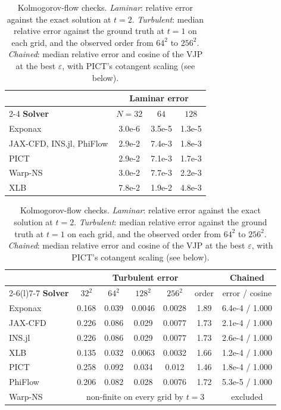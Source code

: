 \begin{table}[h]
  \centering\small
  \caption{Kolmogorov-flow checks. \emph{Laminar}: relative error against the
    exact solution at $t = 2$. \emph{Turbulent}: median relative error against
    the ground truth at $t = 1$ on each grid, and the observed order from $64^2$
    to $256^2$. \emph{Chained}: median relative error and cosine of the VJP at
    the best $\varepsilon$, with PICT's cotangent scaling (see below).}
  \label{tab:app:kolmogorov}
  \begin{tabular}{@{}lccc@{}}
    \toprule
    & \multicolumn{3}{c}{\textbf{Laminar error}} \\
    \cmidrule(l){2-4}
    \textbf{Solver} & $N=32$ & $64$ & $128$ \\
    \midrule
    Exponax & 3.0e-6 & 3.5e-5 & 1.3e-5 \\
    JAX-CFD, INS.jl, PhiFlow & 2.9e-2 & 7.4e-3 & 1.8e-3 \\
    PICT & 2.9e-2 & 7.1e-3 & 1.7e-3 \\
    Warp-NS & 3.0e-2 & 7.7e-3 & 2.2e-3 \\
    XLB & 7.8e-2 & 1.9e-2 & 4.8e-3 \\
    \bottomrule
  \end{tabular}

  \vspace{6pt}
  \begin{tabular}{@{}lcccccc@{}}
    \toprule
    & \multicolumn{5}{c}{\textbf{Turbulent error}} & \multicolumn{1}{c}{\textbf{Chained}} \\
    \cmidrule(lr){2-6}\cmidrule(l){7-7}
    \textbf{Solver} & $32^2$ & $64^2$ & $128^2$ & $256^2$ & order & error / cosine \\
    \midrule
    Exponax & 0.168 & 0.039 & 0.0046 & 0.0028 & 1.89 & 6.4e-4 / 1.000 \\
    JAX-CFD & 0.226 & 0.086 & 0.029 & 0.0077 & 1.73 & 2.1e-4 / 1.000 \\
    INS.jl & 0.226 & 0.086 & 0.029 & 0.0077 & 1.73 & 2.6e-4 / 1.000 \\
    XLB & 0.135 & 0.032 & 0.0063 & 0.0032 & 1.66 & 1.2e-4 / 1.000 \\
    PICT & 0.258 & 0.092 & 0.034 & 0.012 & 1.46 & 1.8e-4 / 1.000 \\
    PhiFlow & 0.206 & 0.082 & 0.028 & 0.0076 & 1.72 & 5.3e-5 / 1.000 \\
    Warp-NS & \multicolumn{5}{c}{non-finite on every grid by $t = 3$} & excluded \\
    \bottomrule
  \end{tabular}
\end{table}

